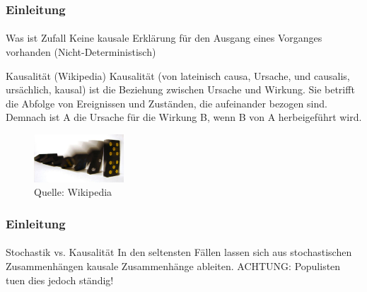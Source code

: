 \documentclass{beamer}
\begin{document}
\begin{frame}
    \frametitle{Einleitung}
\framesubtitle{}

    \begin{block}{Was ist Zufall}
Keine kausale Erklärung für den Ausgang eines Vorganges vorhanden (Nicht-Deterministisch)
\end{block}

   \begin{block}{Kausalität (Wikipedia)}
Kausalität (von lateinisch causa, Ursache, und causalis,  ursächlich, kausal) ist die Beziehung zwischen Ursache und Wirkung. Sie betrifft die Abfolge von Ereignissen und Zuständen, die aufeinander bezogen sind. Demnach ist A die Ursache für die Wirkung B, wenn B von A herbeigeführt wird.
\end{block}

\begin{figure}[htp]
      \centering
    \includegraphics[width=0.3\textwidth]{img/Domino}

      \caption{Quelle: Wikipedia}
\end{figure}


\end{frame}


\begin{frame}
    \frametitle{Einleitung}
\framesubtitle{}
   \begin{block}{Stochastik vs. Kausalität}
In den seltensten Fällen lassen sich aus stochastischen Zusammenhängen kausale Zusammenhänge ableiten. ACHTUNG: Populisten tuen dies jedoch ständig!
\end{block}

\end{frame}
\end{document}
